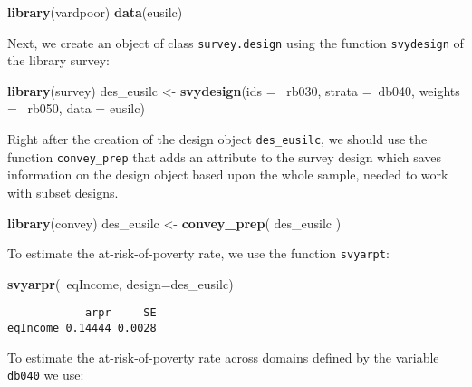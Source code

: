 \documentclass[]{book}
\newenvironment{Shaded}{\begin{snugshade}}{\end{snugshade}}
\newcommand{\KeywordTok}[1]{\textcolor[rgb]{0.13,0.29,0.53}{\textbf{{#1}}}}
\newcommand{\DataTypeTok}[1]{\textcolor[rgb]{0.13,0.29,0.53}{{#1}}}
\newcommand{\StringTok}[1]{\textcolor[rgb]{0.31,0.60,0.02}{{#1}}}
\newcommand{\NormalTok}[1]{{#1}}
\theoremstyle{definition}
\theoremstyle{definition}
\theoremstyle{remark}
\begin{document}
\begin{Shaded}
\begin{Highlighting}[]
\KeywordTok{library}\NormalTok{(vardpoor)}
\KeywordTok{data}\NormalTok{(eusilc)}
\end{Highlighting}
\end{Shaded}

Next, we create an object of class \texttt{survey.design} using the
function \texttt{svydesign} of the library survey:

\begin{Shaded}
\begin{Highlighting}[]
\KeywordTok{library}\NormalTok{(survey)}
\NormalTok{des_eusilc <-}\StringTok{ }\KeywordTok{svydesign}\NormalTok{(}\DataTypeTok{ids =} \NormalTok{~rb030, }\DataTypeTok{strata =}\NormalTok{~db040,  }\DataTypeTok{weights =} \NormalTok{~rb050, }\DataTypeTok{data =} \NormalTok{eusilc)}
\end{Highlighting}
\end{Shaded}

Right after the creation of the design object \texttt{des\_eusilc}, we
should use the function \texttt{convey\_prep} that adds an attribute to
the survey design which saves information on the design object based
upon the whole sample, needed to work with subset designs.

\begin{Shaded}
\begin{Highlighting}[]
\KeywordTok{library}\NormalTok{(convey)}
\NormalTok{des_eusilc <-}\StringTok{ }\KeywordTok{convey_prep}\NormalTok{( des_eusilc )}
\end{Highlighting}
\end{Shaded}

To estimate the at-risk-of-poverty rate, we use the function
\texttt{svyarpt}:

\begin{Shaded}
\begin{Highlighting}[]
\KeywordTok{svyarpr}\NormalTok{(~eqIncome, }\DataTypeTok{design=}\NormalTok{des_eusilc)}
\end{Highlighting}
\end{Shaded}

\begin{verbatim}
            arpr     SE
eqIncome 0.14444 0.0028
\end{verbatim}

To estimate the at-risk-of-poverty rate across domains defined by the
variable \texttt{db040} we use:
\end{document}
